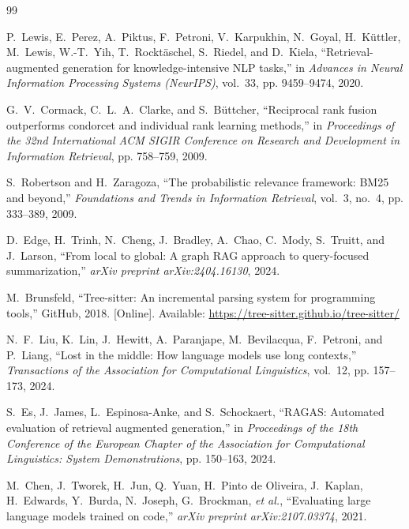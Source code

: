\documentclass[12pt,a4paper,oneside]{report}
\begin{document}
\begin{thebibliography}{99}

P.~Lewis, E.~Perez, A.~Piktus, F.~Petroni, V.~Karpukhin, N.~Goyal, H.~K{\"u}ttler, M.~Lewis, W.-T.~Yih, T.~Rockt{\"a}schel, S.~Riedel, and D.~Kiela, ``Retrieval-augmented generation for knowledge-intensive NLP tasks,'' in \textit{Advances in Neural Information Processing Systems (NeurIPS)}, vol.~33, pp. 9459--9474, 2020.

G.~V.~Cormack, C.~L.~A.~Clarke, and S.~B{\"u}ttcher, ``Reciprocal rank fusion outperforms condorcet and individual rank learning methods,'' in \textit{Proceedings of the 32nd International ACM SIGIR Conference on Research and Development in Information Retrieval}, pp. 758--759, 2009.

S.~Robertson and H.~Zaragoza, ``The probabilistic relevance framework: BM25 and beyond,'' \textit{Foundations and Trends in Information Retrieval}, vol.~3, no.~4, pp. 333--389, 2009.

D.~Edge, H.~Trinh, N.~Cheng, J.~Bradley, A.~Chao, C.~Mody, S.~Truitt, and J.~Larson, ``From local to global: A graph RAG approach to query-focused summarization,'' \textit{arXiv preprint arXiv:2404.16130}, 2024.

M.~Brunsfeld, ``Tree-sitter: An incremental parsing system for programming tools,'' GitHub, 2018. [Online]. Available: \url{https://tree-sitter.github.io/tree-sitter/}

N.~F.~Liu, K.~Lin, J.~Hewitt, A.~Paranjape, M.~Bevilacqua, F.~Petroni, and P.~Liang, ``Lost in the middle: How language models use long contexts,'' \textit{Transactions of the Association for Computational Linguistics}, vol.~12, pp. 157--173, 2024.

S.~Es, J.~James, L.~Espinosa-Anke, and S.~Schockaert, ``RAGAS: Automated evaluation of retrieval augmented generation,'' in \textit{Proceedings of the 18th Conference of the European Chapter of the Association for Computational Linguistics: System Demonstrations}, pp. 150--163, 2024.

M.~Chen, J.~Tworek, H.~Jun, Q.~Yuan, H.~Pinto de Oliveira, J.~Kaplan, H.~Edwards, Y.~Burda, N.~Joseph, G.~Brockman, \textit{et al.}, ``Evaluating large language models trained on code,'' \textit{arXiv preprint arXiv:2107.03374}, 2021.


\end{thebibliography}
\end{document}
